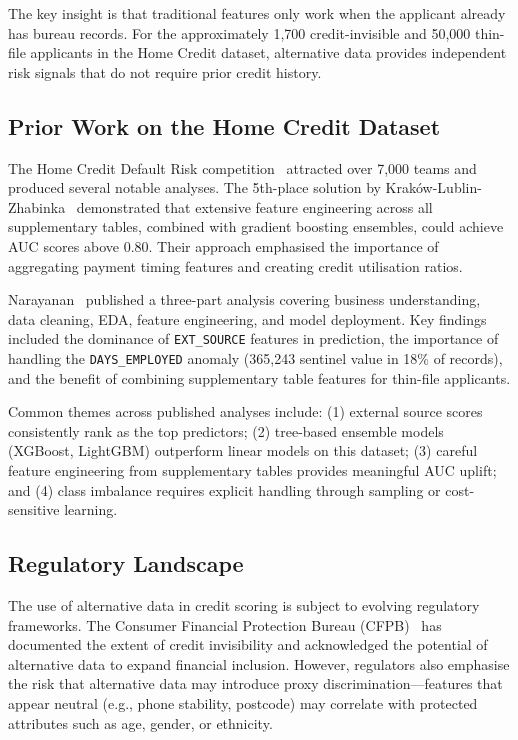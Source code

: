 The key insight is that traditional features only work when the applicant already has bureau records. For the approximately 1,700 credit-invisible and 50,000 thin-file applicants in the Home Credit dataset, alternative data provides independent risk signals that do not require prior credit history.

\subsection{Prior Work on the Home Credit Dataset}

The Home Credit Default Risk competition~\cite{kaggle2018} attracted over 7,000 teams and produced several notable analyses. The 5th-place solution by Krak\'{o}w-Lublin-Zhabinka~\cite{krakow2018} demonstrated that extensive feature engineering across all supplementary tables, combined with gradient boosting ensembles, could achieve AUC scores above 0.80. Their approach emphasised the importance of aggregating payment timing features and creating credit utilisation ratios.

Narayanan~\cite{narayanan2020} published a three-part analysis covering business understanding, data cleaning, EDA, feature engineering, and model deployment. Key findings included the dominance of \texttt{EXT\_SOURCE} features in prediction, the importance of handling the \texttt{DAYS\_EMPLOYED} anomaly (365,243 sentinel value in 18\% of records), and the benefit of combining supplementary table features for thin-file applicants.

Common themes across published analyses include: (1) external source scores consistently rank as the top predictors; (2) tree-based ensemble models (XGBoost, LightGBM) outperform linear models on this dataset; (3) careful feature engineering from supplementary tables provides meaningful AUC uplift; and (4) class imbalance requires explicit handling through sampling or cost-sensitive learning.

\subsection{Regulatory Landscape}

The use of alternative data in credit scoring is subject to evolving regulatory frameworks. The Consumer Financial Protection Bureau (CFPB)~\cite{cfpb2022} has documented the extent of credit invisibility and acknowledged the potential of alternative data to expand financial inclusion. However, regulators also emphasise the risk that alternative data may introduce proxy discrimination---features that appear neutral (e.g., phone stability, postcode) may correlate with protected attributes such as age, gender, or ethnicity.

